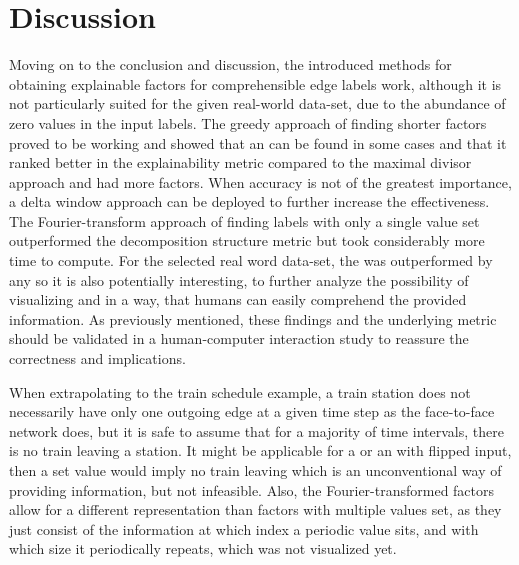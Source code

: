 
\chapter{Discussion}
\label{ch:Discussion}
Moving on to the conclusion and discussion, the introduced methods for obtaining explainable factors for comprehensible edge labels work, although it is not particularly suited for the given real-world data-set, due to the abundance of zero values in the input labels.
The greedy approach of finding shorter factors proved to be working and showed that an \orDecomp can be found in some cases and that it ranked better in the explainability metric compared to the maximal divisor approach and had more factors.
When accuracy is not of the greatest importance, a delta window approach can be deployed to further increase the effectiveness.
The Fourier-transform approach of finding labels with only a single value set outperformed the decomposition structure metric but took considerably more time to compute.
For the selected real word data-set, the \orDecomp was outperformed by any \andDecomp so it is also potentially interesting, to further analyze the possibility of visualizing and \andDecomp in a way, that humans can easily comprehend the provided information.
As previously mentioned, these findings and the underlying metric should be validated in a human-computer interaction study to reassure the correctness and implications. 

When extrapolating to the train schedule example, a train station does not necessarily have only one outgoing edge at a given time step as the face-to-face network does, but it is safe to assume that for a majority of time intervals, there is no train leaving a station.
It might be applicable for a \andDecomp or an \orDecomp with flipped input, then a set value would imply no train leaving which is an unconventional way of providing information, but not infeasible.
Also, the Fourier-transformed factors allow for a different representation than factors with multiple values set, as they just consist of the information at which index a periodic value sits, and with which size it periodically repeats, which was not visualized yet.


